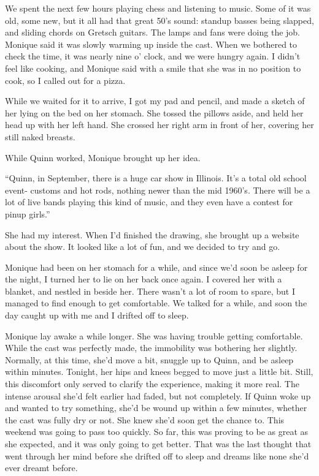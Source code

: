 We spent the next few hours playing chess and listening to music. Some of it was old, some
new, but it all had that great 50's sound: standup basses being slapped, and sliding chords on
Gretsch guitars. The lamps and fans were doing the job. Monique said it was slowly warming up
inside the cast. When we bothered to check the time, it was nearly nine o' clock, and we were
hungry again. I didn't feel like cooking, and Monique said with a smile that she was in no
position to cook, so I called out for a pizza.

While we waited for it to arrive, I got my pad and pencil, and made a sketch of her lying
on the bed on her stomach. She tossed the pillows aside, and held her head up with her left
hand. She crossed her right arm in front of her, covering her still naked breasts.

While Quinn worked, Monique brought up her idea.

``Quinn, in September, there is a huge car show in Illinois. It's a total old school event-
customs and hot rods, nothing newer than the mid 1960's. There will be a lot of live bands
playing this kind of music, and they even have a contest for pinup girls.''

She had my interest. When I'd finished the drawing, she brought up a website about the
show. It looked like a lot of fun, and we decided to try and go.

Monique had been on her stomach for a while, and since we'd soon be asleep for the night, I
turned her to lie on her back once again. I covered her with a blanket, and nestled in beside
her. There wasn't a lot of room to spare, but I managed to find enough to get comfortable. We
talked for a while, and soon the day caught up with me and I drifted off to sleep.

\begin{thought}
Monique lay awake a while longer. She was having trouble getting comfortable. While the cast
was perfectly made, the immobility was bothering her slightly. Normally, at this time, she'd
move a bit, snuggle up to Quinn, and be asleep within minutes. Tonight, her hips and knees
begged to move just a little bit. Still, this discomfort only served to clarify the experience,
making it more real. The intense arousal she'd felt earlier had faded, but not completely. If
Quinn woke up and wanted to try something, she'd be wound up within a few minutes, whether the
cast was fully dry or not. She knew she'd soon get the chance to. This weekend was going to pass
too quickly. So far, this was proving to be as great as she expected, and it was only going to
get better. That was the last thought that went through her mind before she drifted off to sleep
and dreams like none she'd ever dreamt before.
\end{thought}

